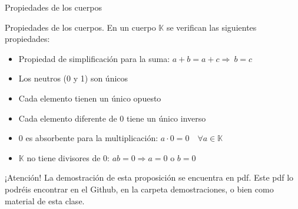 \documentclass[
  ignorenonframetext,
]{beamer}
\providecommand{\tightlist}{%
  \setlength{\itemsep}{0pt}\setlength{\parskip}{0pt}}
\begin{document}
\begin{frame}{Propiedades de los cuerpos}
\protect\hypertarget{propiedades-de-los-cuerpos}{}

Propiedades de los cuerpos. En un cuerpo \(\mathbb{K}\) se verifican las
siguientes propiedades:

\begin{itemize}
\tightlist
\item
  Propiedad de simplificación para la suma: \(a+b=a+c\Rightarrow\ b=c\)
\item
  Los neutros (0 y 1) son únicos
\item
  Cada elemento tienen un único opuesto
\item
  Cada elemento diferente de 0 tiene un único inverso
\item
  0 es absorbente para la multiplicación:
  \(a\cdot 0 = 0\quad \forall a\in\mathbb{K}\)
\item
  \(\mathbb{K}\) no tiene divisores de 0: \(ab=0\Rightarrow a=0\) o
  \(b=0\)
\end{itemize}

¡Atención! La demostración de esta proposición se encuentra en pdf. Este
pdf lo podréis encontrar en el Github, en la carpeta demostraciones, o
bien como material de esta clase.

\end{frame}
\end{document}
